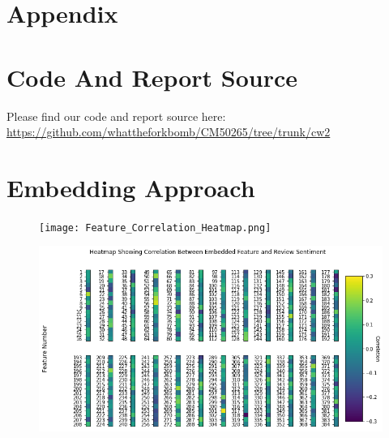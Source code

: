 \section*{\Large Appendix}
\appendix

\section{Code And Report Source}
Please find our code and report source here: \url{https://github.com/whattheforkbomb/CM50265/tree/trunk/cw2}

\section{Embedding Approach}
\begin{figure}[h]
    \texttt{[image: Feature\_Correlation\_Heatmap.png]}
\end{figure}
\begin{figure}[h]
    \includegraphics[width=\textwidth]{figures/Feature_Correlation_Heatmap_Non_Trunkated_Embedding.png}
\end{figure}

